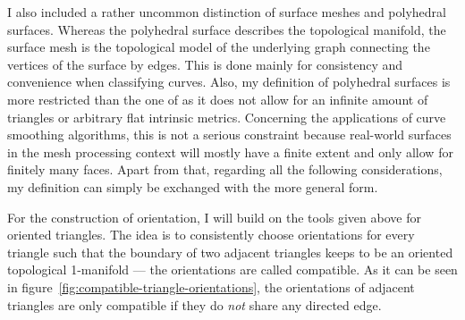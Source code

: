 \documentclass{stdlocal}
\begin{document}
  I also included a rather uncommon distinction of surface meshes and polyhedral surfaces.
  Whereas the polyhedral surface describes the topological manifold, the surface mesh is the topological model of the underlying graph connecting the vertices of the surface by edges.
  This is done mainly for consistency and convenience when classifying curves.
  Also, my definition of polyhedral surfaces is more restricted than the one of \textcite{polthier2006} as it does not allow for an infinite amount of triangles or arbitrary flat intrinsic metrics.
  Concerning the applications of curve smoothing algorithms, this is not a serious constraint because real-world surfaces in the mesh processing context will mostly have a finite extent and only allow for finitely many faces.
  Apart from that, regarding all the following considerations, my definition can simply be exchanged with the more general form.

  For the construction of orientation, I will build on the tools given above for oriented triangles.
  The idea is to consistently choose orientations for every triangle such that the boundary of two adjacent triangles keeps to be an oriented topological 1-manifold --- the orientations are called compatible.
  As it can be seen in figure~\ref{fig:compatible-triangle-orientations}, the orientations of adjacent triangles are only compatible if they do \textit{not} share any directed edge.
\end{document}
